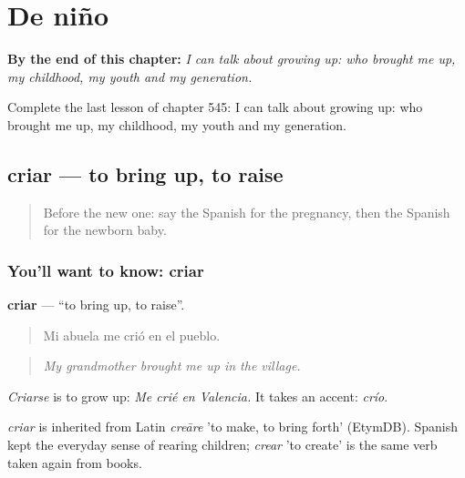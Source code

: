 
\chapter{De niño}
\label{ch:es-de-nino}

\begin{chapteropening}
\textbf{By the end of this chapter:} \emph{I can talk about growing up: who brought me up, my childhood, my youth and my generation.}

Complete the last lesson of chapter 545: I can talk about growing up: who brought me up, my childhood, my youth and my generation.
\end{chapteropening}

\section[criar]{criar — to bring up, to raise}

\label{lesson:ES-C545-criar}



\begin{quote}
Before the new one: say the Spanish for the pregnancy, then the Spanish for the newborn baby.
\end{quote}

\subsection*{You'll want to know: criar}
\textbf{criar} — \textquotedblleft{}to bring up, to raise\textquotedblright{}.

\begin{quote}
Mi abuela me crió en el pueblo.
\end{quote}

\begin{quote}
\emph{My grandmother brought me up in the village.}
\end{quote}

\emph{Criarse} is to grow up: \emph{Me crié en Valencia.} It takes an accent: \emph{crío}.

\begin{cousinweb}
\emph{criar} is inherited from Latin \emph{creāre} 'to make, to bring forth' (EtymDB). Spanish kept the everyday sense of rearing children; \emph{crear} 'to create' is the same verb taken again from books.
\end{cousinweb}

